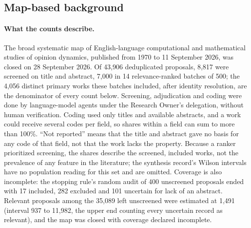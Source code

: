 
\subsection*{Map-based background}

\paragraph{What the counts describe.}
The broad systematic map of English-language computational and mathematical studies of opinion dynamics, published from 1970 to 11 September 2026, was closed on 28 September 2026. %
Of 43,906 deduplicated proposals, 8,817 were screened on title and abstract, 7,000 in 14 relevance-ranked batches of 500; the 4,056 distinct primary works these batches included, after identity resolution, are the denominator of every count below. %
Screening, adjudication and coding were done by language-model agents under the Research Owner's delegation, without human verification. %
Coding used only titles and available abstracts, and a work could receive several codes per field, so shares within a field can sum to more than 100\%. %
``Not reported'' means that the title and abstract gave no basis for any code of that field, not that the work lacks the property. %
Because a ranker prioritized screening, the shares describe the screened, included works, not the prevalence of any feature in the literature; the synthesis record's Wilson intervals have no population reading for this set and are omitted. %
Coverage is also incomplete: the stopping rule's random audit of 400 unscreened proposals ended with 17 included, 282 excluded and 101 uncertain for lack of an abstract. %
Relevant proposals among the 35,089 left unscreened were estimated at 1,491 (interval 937 to 11,982, the upper end counting every uncertain record as relevant), and the map was closed with coverage declared incomplete. %

